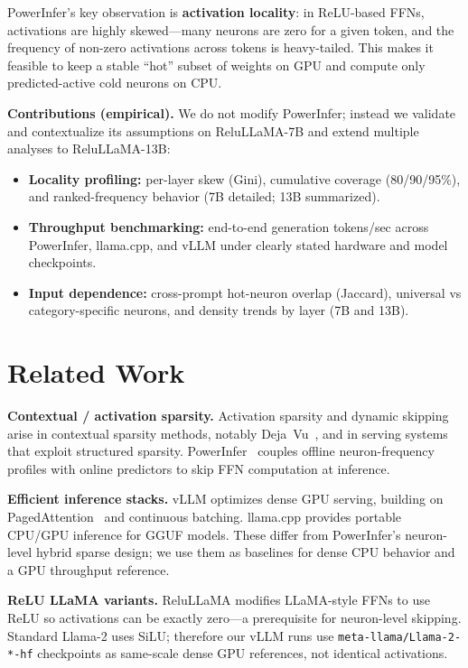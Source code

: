 \documentclass{article}
\begin{document}
PowerInfer's key observation is \textbf{activation locality}: in ReLU-based FFNs, activations are highly skewed---many neurons are zero for a given token, and the frequency of non-zero activations across tokens is heavy-tailed.
This makes it feasible to keep a stable ``hot'' subset of weights on GPU and compute only predicted-active cold neurons on CPU.

\textbf{Contributions (empirical).} We do not modify PowerInfer; instead we validate and contextualize its assumptions on ReluLLaMA-7B and extend multiple analyses to ReluLLaMA-13B:
\begin{itemize}
  \item \textbf{Locality profiling:} per-layer skew (Gini), cumulative coverage (80/90/95\%), and ranked-frequency behavior (7B detailed; 13B summarized).
  \item \textbf{Throughput benchmarking:} end-to-end generation tokens/sec across PowerInfer, llama.cpp, and vLLM under clearly stated hardware and model checkpoints.
  \item \textbf{Input dependence:} cross-prompt hot-neuron overlap (Jaccard), universal vs category-specific neurons, and density trends by layer (7B and 13B).
\end{itemize}

\section{Related Work}
\textbf{Contextual / activation sparsity.} Activation sparsity and dynamic skipping arise in contextual sparsity methods, notably Deja~Vu~\cite{liu2023dejavucontextualsparsity}, and in serving systems that exploit structured sparsity. PowerInfer~\cite{song2024powerinferfastlargelanguage} couples offline neuron-frequency profiles with online predictors to skip FFN computation at inference.

\textbf{Efficient inference stacks.} vLLM optimizes dense GPU serving, building on PagedAttention~\cite{kwon2023efficientmemorymanagementlarge} and continuous batching. llama.cpp provides portable CPU/GPU inference for GGUF models. These differ from PowerInfer's neuron-level hybrid sparse design; we use them as baselines for dense CPU behavior and a GPU throughput reference.

\textbf{ReLU LLaMA variants.} ReluLLaMA modifies LLaMA-style FFNs to use ReLU so activations can be exactly zero---a prerequisite for neuron-level skipping. Standard Llama-2 uses SiLU; therefore our vLLM runs use \texttt{meta-llama/Llama-2-*-hf} checkpoints as same-scale dense GPU references, not identical activations.
\end{document}
